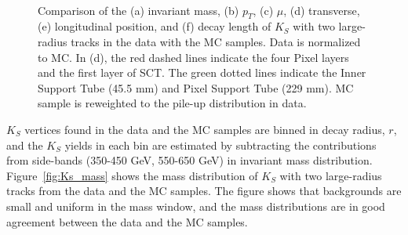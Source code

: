 \begin{figure}[!htb]
     \\
    \caption{Comparison of the (a) invariant mass, (b) $p_{T}$, (c) $\mu$, (d) transverse, (e) longitudinal position, and (f) decay length of $K_{S}$ with two large-radius tracks in the data with the MC samples. Data is normalized to MC. In (d), the red dashed lines indicate the four Pixel layers and the first layer of SCT. The green dotted lines indicate the Inner Support Tube (45.5 mm) and Pixel Support Tube (229 mm). MC sample is reweighted to the pile-up distribution in data.}
    \label{fig:Ks_data_MC}
\end{figure}

$K_{S}$ vertices found in the data and the MC samples are binned in decay radius, $r$, and the $K_{S}$ yields in each bin are estimated by subtracting the contributions from side-bands (350-450 GeV, 550-650 GeV) in invariant mass distribution. Figure~\ref{fig:Ks_mass} shows the mass distribution of $K_{S}$ with two large-radius tracks from the data and the MC samples. The figure shows that backgrounds are small and uniform in the mass window, and the mass distributions are in good agreement between the data and the MC samples.

